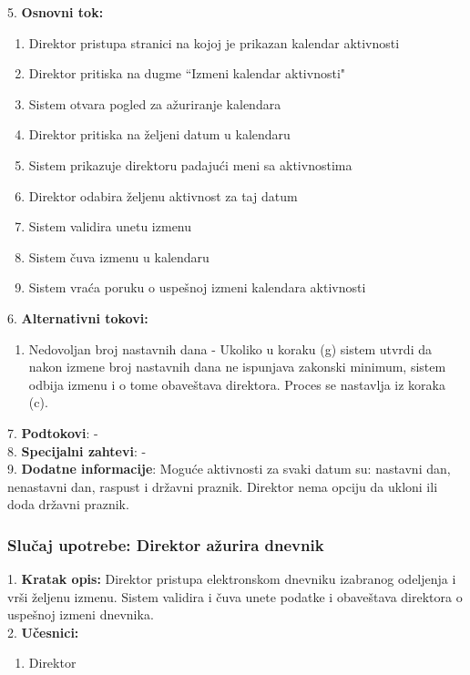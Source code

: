 \documentclass{article}
\begin{document}
5. \textbf{Osnovni tok:} 
\begin{enumerate} [label=(\alph*)]
\item Direktor pristupa stranici na kojoj je prikazan kalendar aktivnosti
\item Direktor pritiska na dugme ``Izmeni kalendar aktivnosti"  
\item Sistem otvara pogled za ažuriranje kalendara
\item Direktor pritiska na željeni datum u kalendaru
\item Sistem prikazuje direktoru padajući meni sa aktivnostima
\item Direktor odabira željenu aktivnost za taj datum
\item Sistem validira unetu izmenu
\item Sistem čuva izmenu u kalendaru
\item Sistem vraća poruku o uspešnoj izmeni kalendara aktivnosti 
\end{enumerate}

6. \textbf{Alternativni tokovi:}
\begin{enumerate} [label=(\roman*)]
\item Nedovoljan broj nastavnih dana - Ukoliko u koraku (g) sistem utvrdi da nakon izmene broj nastavnih dana ne ispunjava zakonski minimum, sistem odbija izmenu i o tome obaveštava direktora. Proces se nastavlja iz koraka (c).
\end{enumerate}

7. \textbf{Podtokovi}:  - \\

8. \textbf{Specijalni zahtevi}: - \\

9. \textbf{Dodatne informacije}: Moguće aktivnosti za svaki datum su: nastavni dan, nenastavni dan, raspust i državni praznik. Direktor nema opciju da ukloni ili doda državni praznik. \\


\subsubsection{Slučaj upotrebe: Direktor ažurira dnevnik} 
1. \textbf{Kratak opis:} Direktor pristupa elektronskom dnevniku izabranog odeljenja i vrši željenu izmenu. Sistem validira i čuva unete podatke i obaveštava direktora o uspešnoj izmeni dnevnika. \\

2. \textbf{Učesnici:}
\begin{enumerate} [label=(\alph*)]
\item Direktor
\end{enumerate} 
\end{document}
